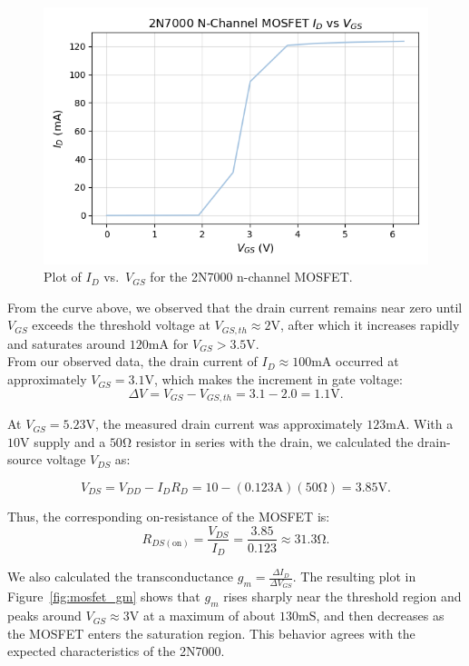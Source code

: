 \documentclass{article}
\begin{document}
\begin{figure}[H]
    \centering
    \includegraphics[width=0.8\linewidth]{6.2a.png}
    \caption{Plot of $I_D$ vs.\ $V_{GS}$ for the 2N7000 n-channel MOSFET.}
    \label{fig:mosfet_id_vgs}
\end{figure}

\noindent From the curve above, we observed that the drain current remains near
zero until $V_{GS}$ exceeds the threshold voltage at $V_{GS,th}\approx2\si{\volt}$, 
after which it increases rapidly and saturates around $120\si{\milli\ampere}$ for
$V_{GS} > 3.5\si{\volt}$.\\

\noindent From our observed data, the drain current of $I_D\approx100\si{\milli\ampere}$ occurred at
approximately $V_{GS}=3.1\si{\volt}$, which makes the increment in gate voltage:
\begin{equation}
    \Delta V = V_{GS}-V_{GS,th}=3.1-2.0=1.1\si{\volt}.
\end{equation}

\noindent At $V_{GS}=5.23\si{\volt}$, the measured drain current was
approximately $123\si{\milli\ampere}$. With a $10\si{\volt}$ supply and a $50\si{\ohm}$
resistor in series with the drain, we calculated the drain-source voltage $V_{DS}$ as:

\begin{equation}
    V_{DS}=V_{DD}-I_D R_D=10-(0.123\si{\ampere})(50\si{\ohm})=3.85\si{\volt}.
\end{equation}

\noindent Thus, the corresponding on-resistance of the MOSFET is:
\begin{equation}
    R_{DS(\text{on})}=\frac{V_{DS}}{I_D}=\frac{3.85}{0.123}\approx31.3\si{\ohm}.
\end{equation}

\noindent We also calculated the transconductance $g_m=\frac{\Delta I_D}{\Delta V_{GS}}$. 
The resulting plot in Figure~\ref{fig:mosfet_gm} shows that $g_m$ rises sharply near
the threshold region and peaks around $V_{GS}\approx3\si{\volt}$ at a maximum
of about $130\si{\milli\siemens}$, and then decreases as the MOSFET enters the
saturation region. This behavior agrees with the expected characteristics of the
2N7000.
\end{document}

